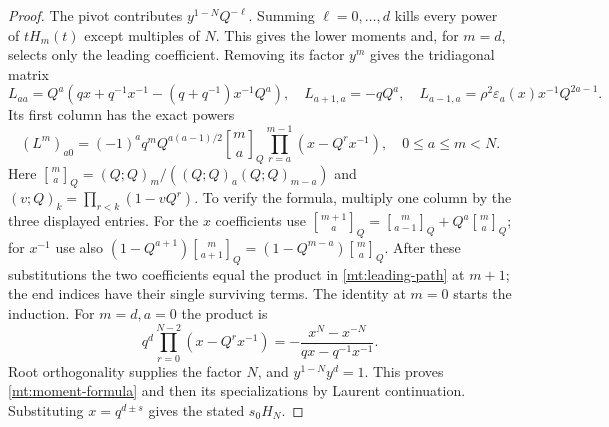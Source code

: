 \documentclass[11pt]{article}
\numberwithin{equation}{section}
\theoremstyle{definition}\newtheorem{definition}[theorem]{Definition}
\theoremstyle{remark}\newtheorem{remark}[theorem]{Remark}
\begin{document}
\begin{proof}
The pivot contributes $y^{1-N}Q^{-\ell}$. Summing $\ell=0,\ldots,d$
kills every power of $tH_m(t)$ except multiples of $N$. This gives
the lower moments and, for $m=d$, selects only the leading
coefficient. Removing its factor $y^m$ gives the tridiagonal matrix
\[
 L_{aa}=Q^a(qx+q^{-1}x^{-1}-(q+q^{-1})x^{-1}Q^a),\quad
 L_{a+1,a}=-qQ^a,\quad
 L_{a-1,a}=\rho^2\varepsilon_a(x)x^{-1}Q^{2a-1}.
\]
Its first column has the exact powers
\begin{equation}\label{mt:leading-path}
 (L^m)_{a0}=(-1)^aq^mQ^{a(a-1)/2}\genfrac{[}{]}{0pt}{}{m}{a}_Q
                    \prod_{r=a}^{m-1}(x-Q^rx^{-1}),\quad 0\le a\le m<N.
\end{equation}
Here $\genfrac{[}{]}{0pt}{}{m}{a}_Q=(Q;Q)_m/((Q;Q)_a(Q;Q)_{m-a})$ and
$(v;Q)_k=\prod_{r<k}(1-vQ^r)$. To verify the formula, multiply
one column by the three displayed entries. For the $x$ coefficients
use $\genfrac{[}{]}{0pt}{}{m+1}{a}_Q=\genfrac{[}{]}{0pt}{}{m}{a-1}_Q+Q^a\genfrac{[}{]}{0pt}{}{m}{a}_Q$;
for $x^{-1}$ use also
$(1-Q^{a+1})\genfrac{[}{]}{0pt}{}{m}{a+1}_Q=(1-Q^{m-a})\genfrac{[}{]}{0pt}{}{m}{a}_Q$.
After these substitutions the two coefficients equal the product in
\eqref{mt:leading-path} at $m+1$; the end indices have their single
surviving terms. The identity at $m=0$ starts the induction.
For $m=d,a=0$ the product is
\[
 q^d\prod_{r=0}^{N-2}(x-Q^rx^{-1})
       =-\frac{x^N-x^{-N}}{qx-q^{-1}x^{-1}}.
\]
Root orthogonality supplies the factor $N$, and
$y^{1-N}y^d=1$. This proves \eqref{mt:moment-formula} and then its
specializations by Laurent continuation. Substituting $x=q^{d\pm s}$
gives the stated $s_0H_N$.
\end{proof}
\end{document}
